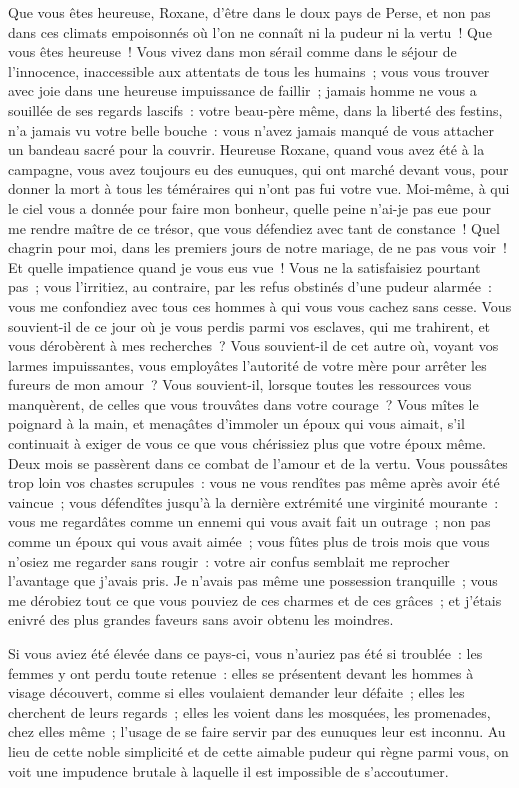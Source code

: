 \documentclass[french,twoside]{book} %
\begin{document}
\noindent Que vous êtes heureuse, Roxane, d’être dans le doux pays de Perse, et non pas dans ces climats empoisonnés où l’on ne connaît ni la pudeur ni la vertu ! Que vous êtes heureuse ! Vous vivez dans mon sérail comme dans le séjour de l’innocence, inaccessible aux attentats de tous les humains ; vous vous trouver avec joie dans une heureuse impuissance de faillir ; jamais homme ne vous a souillée de ses regards lascifs : votre beau-père même, dans la liberté des festins, n’a jamais vu votre belle bouche : vous n’avez jamais manqué de vous attacher un bandeau sacré pour la couvrir. Heureuse Roxane, quand vous avez été à la campagne, vous avez toujours eu des eunuques, qui ont marché devant vous, pour donner la mort à tous les téméraires qui n’ont pas fui votre vue. Moi-même, à qui le ciel vous a donnée pour faire mon bonheur, quelle peine n’ai-je pas eue pour me rendre maître de ce trésor, que vous défendiez avec tant de constance ! Quel chagrin pour moi, dans les premiers jours de notre mariage, de ne pas vous voir ! Et quelle impatience quand je vous eus vue ! Vous ne la satisfaisiez pourtant pas ; vous l’irritiez, au contraire, par les refus obstinés d’une pudeur alarmée : vous me confondiez avec tous ces hommes à qui vous vous cachez sans cesse. Vous souvient-il de ce jour où je vous perdis parmi vos esclaves, qui me trahirent, et vous dérobèrent à mes recherches ? Vous souvient-il de cet autre où, voyant vos larmes impuissantes, vous employâtes l’autorité de votre mère pour arrêter les fureurs de mon amour ? Vous souvient-il, lorsque toutes les ressources vous manquèrent, de celles que vous trouvâtes dans votre courage ? Vous mîtes le poignard à la main, et menaçâtes d’immoler un époux qui vous aimait, s’il continuait à exiger de vous ce que vous chérissiez plus que votre époux même. Deux mois se passèrent dans ce combat de l’amour et de la vertu. Vous poussâtes trop loin vos chastes scrupules : vous ne vous rendîtes pas même après avoir été vaincue ; vous défendîtes jusqu’à la dernière extrémité une virginité mourante : vous me regardâtes comme un ennemi qui vous avait fait un outrage ; non pas comme un époux qui vous avait aimée ; vous fûtes plus de trois mois que vous n’osiez me regarder sans rougir : votre air confus semblait me reprocher l’avantage que j’avais pris. Je n’avais pas même une possession tranquille ; vous me dérobiez tout ce que vous pouviez de ces charmes et de ces grâces ; et j’étais enivré des plus grandes faveurs sans avoir obtenu les moindres.\par
Si vous aviez été élevée dans ce pays-ci, vous n’auriez pas été si troublée : les femmes y ont perdu toute retenue : elles se présentent devant les hommes à visage découvert, comme si elles voulaient demander leur défaite ; elles les cherchent de leurs regards ; elles les voient dans les mosquées, les promenades, chez elles même ; l’usage de se faire servir par des eunuques leur est inconnu. Au lieu de cette noble simplicité et de cette aimable pudeur qui règne parmi vous, on voit une impudence brutale à laquelle il est impossible de s’accoutumer.\par
\end{document}

